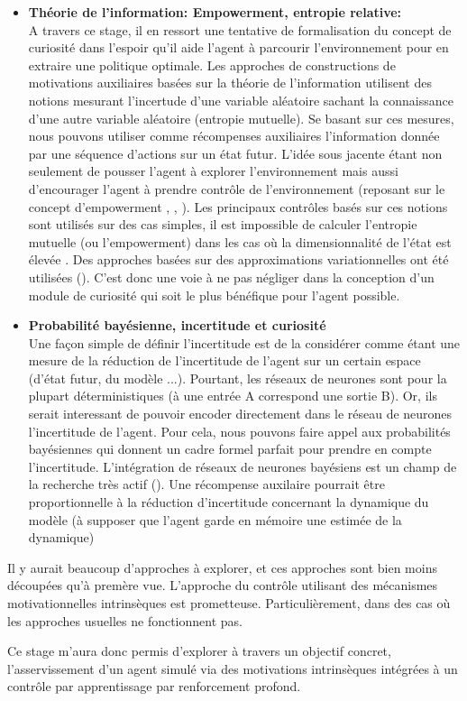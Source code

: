 \begin{itemize}
\item \textbf{Théorie de l'information: Empowerment, entropie relative:}\\
    A travers ce stage, il en ressort une tentative de formalisation du concept de curiosité dans l'espoir qu'il aide l'agent à parcourir l'environnement pour en extraire une politique optimale. Les approches de constructions de motivations auxiliaires basées sur la théorie de l'information utilisent des notions mesurant l'incertude d'une variable aléatoire sachant la connaissance d'une autre variable aléatoire (entropie mutuelle). Se basant sur ces mesures, nous pouvons utiliser comme récompenses auxiliaires l'information donnée par une séquence d'actions sur un état futur. L'idée sous jacente étant non seulement de pousser l'agent à explorer l'environnement mais aussi d'encourager l'agent à prendre contrôle de l'environnement (reposant sur le concept d'empowerment \cite{empowerment}, \cite{empowerment2}, \cite{empowerment3}). Les principaux contrôles basés sur ces notions sont utilisés sur des cas simples, il est impossible de calculer l'entropie mutuelle (ou l'empowerment) dans les cas où la dimensionnalité de l'état est élevée . Des approches basées sur des approximations variationnelles ont été utilisées (\cite{controleempowerment}). C'est donc une voie à ne pas négliger dans la conception d'un module de curiosité qui soit le plus bénéfique pour l'agent possible. 
\item \textbf{Probabilité bayésienne, incertitude et curiosité}\\
    Une façon simple de définir l'incertitude est de la considérer comme étant une mesure de la réduction de l'incertitude de l'agent sur un certain espace (d'état futur, du modèle ...). Pourtant, les réseaux de neurones sont pour la plupart déterministiques (à une entrée A correspond une sortie B). Or, ils serait interessant de pouvoir encoder directement dans le réseau de neurones l'incertitude de l'agent. Pour cela, nous pouvons faire appel aux probabilités bayésiennes qui donnent un cadre formel parfait pour prendre en compte l'incertitude. L'intégration de réseaux de neurones bayésiens est un champ de la recherche très actif (\cite{neuronebayes}). Une récompense auxilaire pourrait être proportionnelle à la réduction d'incertitude concernant la dynamique du modèle (à supposer que l'agent garde en mémoire une estimée de la dynamique) \cite{VIME}
\end{itemize}

Il y aurait beaucoup d'approches à explorer, et ces approches sont bien moins découpées qu'à premère vue. L'approche du contrôle utilisant des mécanismes motivationnelles intrinsèques est prometteuse. Particulièrement, dans des cas où les approches usuelles ne fonctionnent pas. 

Ce stage m'aura donc permis d'explorer à travers un objectif concret, l'asservissement d'un agent simulé via des motivations intrinsèques intégrées à un contrôle par apprentissage par renforcement profond.

